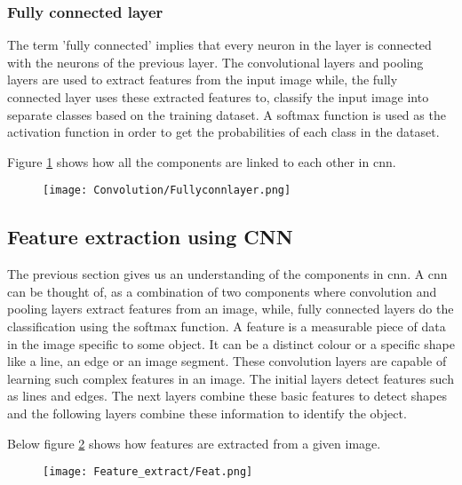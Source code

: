 \subsubsection{Fully connected layer}

The term 'fully connected' implies that every neuron in the layer is connected with the neurons of the previous layer. The convolutional layers and pooling layers are used to extract features from the input image while, the fully connected layer uses these extracted features to, classify the input image into separate classes based on the training dataset. A softmax function is used as the activation function in order to get the probabilities of each class in the dataset. 

\par

Figure \ref{FCN} shows how all the components are linked to each other in \ac{cnn}. 

\begin{figure}[h!]
    \centering
        \texttt{[image: Convolution/Fullyconnlayer.png]}
    \caption{\cite{VoPa}}
    \label{FCN}
\end{figure}

\subsection{Feature extraction using CNN} \label{feature_extractor}

The previous section gives us an understanding of the components in \ac{cnn}. A \ac{cnn} can be thought of, as a combination of two components where convolution and pooling layers extract features from an image, while, fully connected layers do the classification using the softmax function. A feature is a measurable piece of data in the image specific to some object. It can be a distinct colour or a specific shape like a line, an edge or an image segment. These convolution layers are capable of learning such complex features in an image. The initial layers detect features such as lines and edges. The next layers combine these basic features to detect shapes and the following layers combine these information to identify the object. 


\par

Below figure \ref{Feature_extraction} shows how features are extracted from a given image. 

\begin{figure}[h!]
    \centering
        \texttt{[image: Feature\_extract/Feat.png]}
    \caption{\cite{Elgendy}}
    \label{Feature_extraction}
\end{figure}


